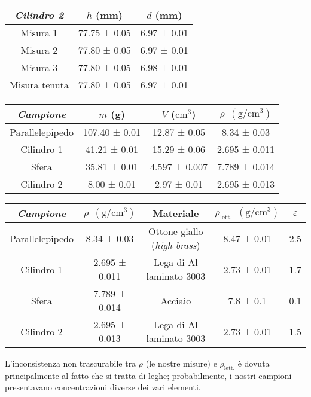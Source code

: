 \documentclass{article}
\begin{document}
\begin{center}
\begin{tabular}{ |c|c| }
    \end{tabular}
    \newline
    \vspace*{0.4 cm}
    \newline
    \begin{tabular}{ |c|c|c| }
        \hline
        \emph{Cilindro 2} & $h$ (mm) & $d$ (mm) \\
        \hline
        Misura 1 & 77.75 ± 0.05 & 6.97 ± 0.01 \\
        Misura 2 & 77.80 ± 0.05 & 6.97 ± 0.01 \\
        Misura 3 & 77.80 ± 0.05 & 6.98 ± 0.01 \\
        \hline
        Misura tenuta & 77.80 ± 0.05 & 6.97 ± 0.01 \\
        \hline
    \end{tabular}
    \newline
    \vspace*{0.4 cm}
    \newline
    \begin{tabular}{ |c|c|c|c| }
        \hline
        \emph{Campione} & $m$ (g) & $V$ ($\text{cm}^3$) & $\rho\enspace(\text{g} / \text{cm}^3)$\\
        \hline
        Parallelepipedo & 107.40 ± 0.01 & 12.87 ± 0.05 & 8.34 ± 0.03 \\
        Cilindro 1 & 41.21 ± 0.01 & 15.29 ± 0.06 & 2.695 ± 0.011 \\
        Sfera & 35.81 ± 0.01 & 4.597 ± 0.007 & 7.789 ± 0.014 \\
        Cilindro 2 & 8.00 ± 0.01 & 2.97 ± 0.01 & 2.695 ± 0.013 \\
        \hline
    \end{tabular}
    \newline
    \vspace*{0.4 cm}
    \newline
    \begin{tabular}{ |c|c|c|c|c| }
        \hline
        \emph{Campione} & $\rho\enspace(\text{g} / \text{cm}^3)$ & Materiale & $\rho_\text{lett.}\enspace(\text{g} / \text{cm}^3)$ & $\varepsilon$ \\
        \hline
        Parallelepipedo & 8.34 ± 0.03 & Ottone giallo (\emph{high brass}) & 8.47 ± 0.01 & 2.5 \\
        Cilindro 1 & 2.695 ± 0.011 & Lega di Al laminato 3003 & 2.73 ± 0.01 & 1.7 \\
        Sfera & 7.789 ± 0.014 & Acciaio & 7.8 ± 0.1 & 0.1 \\
        Cilindro 2 & 2.695 ± 0.013 & Lega di Al laminato 3003 & 2.73 ± 0.01 & 1.5 \\
        \hline
    \end{tabular}
\end{center}

L'inconsistenza non trascurabile tra $\rho$ (le nostre misure) e $\rho_\text{lett.}$ è dovuta principalmente al fatto che si tratta di leghe; probabilmente, i nostri campioni presentavano concentrazioni diverse dei vari elementi.
\end{document}
